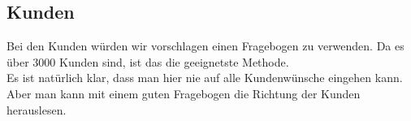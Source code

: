 \subsection{Kunden}
Bei den Kunden würden wir vorschlagen einen Fragebogen zu verwenden. Da es über 3000 Kunden sind, ist das die geeignetste Methode.\\
Es ist natürlich klar, dass man hier nie auf alle Kundenwünsche eingehen kann. Aber man kann mit einem guten Fragebogen die Richtung der Kunden herauslesen.